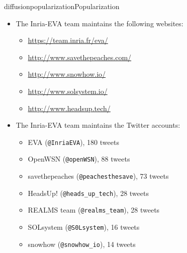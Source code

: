 \documentclass{ra2016}
\begin{document}
\begin{module}{diffusion}{popularization}{Popularization}
\begin{itemize}
    \item The Inria-EVA team maintains the following websites:
        \begin{itemize}
            \item \url{https://team.inria.fr/eva/}
            \item \url{http://www.savethepeaches.com/}
            \item \url{http://www.snowhow.io/}
            \item \url{http://www.solsystem.io/}
            \item \url{http://www.headsup.tech/}
        \end{itemize}
    \item The Inria-EVA team maintains the Twitter accounts:
        \begin{itemize}
            \item EVA ({\tt @InriaEVA}), 180 tweets
            \item OpenWSN ({\tt @openWSN}), 88 tweets
            \item savethepeaches ({\tt @peachesthesave}),  73 tweets
            \item HeadsUp! ({\tt @heads\_up\_tech}), 28 tweets
            \item REALMS team ({\tt @realms\_team}), 28 tweets
            \item SOLsystem ({\tt @S0Lsystem}), 16 tweets
            \item snowhow ({\tt @snowhow\_io}), 14 tweets
        \end{itemize}
\end{itemize}

\end{module}

\end{document}
